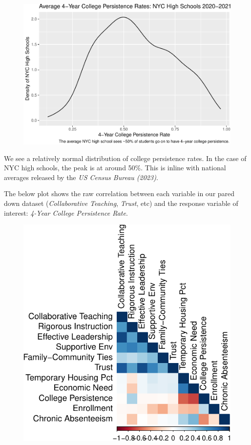 \documentclass[
  man,floatsintext]{apa6}
\begin{document}
\begin{figure}[H]
\includegraphics[width=\textwidth]{final-project_files/figure-latex/unnamed-chunk-4-1} \caption{ }\label{fig:unnamed-chunk-4}
\end{figure}

We see a relatively normal distribution of college persistence rates. In the case of NYC high schools, the peak is at around 50\%. This is inline with national averages released by the \emph{US Census Bureau (2023)}.

The below plot shows the raw correlation between each variable in our pared down dataset (\emph{Collaborative Teaching}, \emph{Trust}, etc) and the response variable of interest: \emph{4-Year College Persistence Rate}.

\begin{figure}[H]
\includegraphics[width=\textwidth]{final-project_files/figure-latex/unnamed-chunk-5-1} \caption{ }\label{fig:unnamed-chunk-5}
\end{figure}
\end{document}

